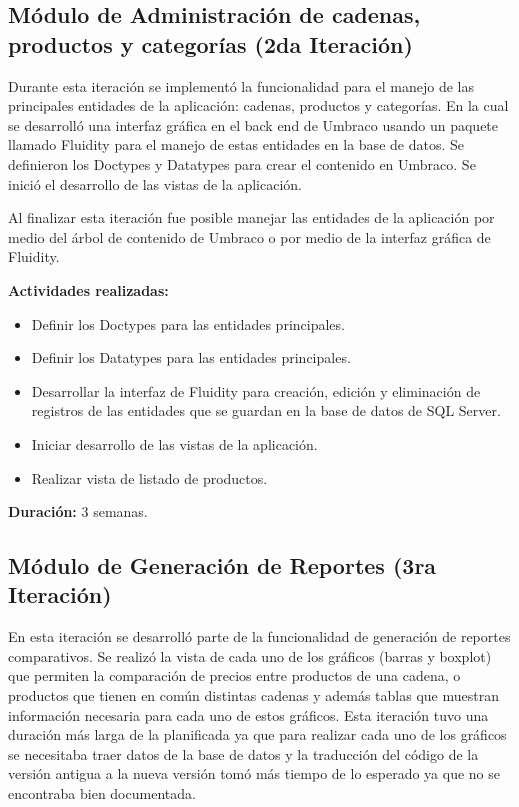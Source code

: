\subsection{Módulo de Administración de cadenas, productos y categorías (2da Iteración)}
Durante esta iteración se implementó la funcionalidad para el manejo de las principales entidades de la aplicación: cadenas, productos y categorías. En la cual se desarrolló una interfaz gráfica en el back end de Umbraco usando un paquete llamado Fluidity para el manejo de estas entidades en la base de datos. Se definieron los Doctypes y Datatypes para crear el contenido en Umbraco. Se inició el desarrollo de las vistas de la aplicación.

Al finalizar esta iteración fue posible manejar las entidades de la aplicación por medio del árbol de contenido de Umbraco o por medio de la interfaz gráfica de Fluidity. 

\textbf{Actividades realizadas:}
\begin{itemize}
   \item Definir los Doctypes para las entidades principales.
   \item Definir los Datatypes para las entidades principales.
   \item Desarrollar la interfaz de Fluidity para creación, edición y eliminación de registros de las entidades que se guardan en la base de datos de SQL Server.
   \item Iniciar desarrollo de las vistas de la aplicación.
   \item Realizar vista de listado de productos.
\end{itemize}


\textbf{Duración:} 3 semanas.

\subsection{Módulo de Generación de Reportes (3ra Iteración)}
En esta iteración se desarrolló parte de la funcionalidad de generación de reportes comparativos. Se realizó la vista de cada uno de los gráficos (barras y boxplot) que permiten la comparación de precios entre productos de una cadena, o productos que tienen en común distintas cadenas y además tablas que muestran información necesaria para cada uno de estos gráficos. Esta iteración tuvo una duración más larga de la planificada ya que para realizar cada uno de los gráficos se necesitaba traer datos de la base de datos y la traducción del código de la versión antigua a la nueva versión tomó más tiempo de lo esperado ya que no se encontraba bien documentada.



